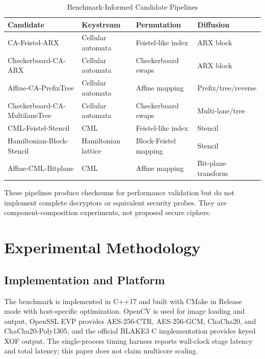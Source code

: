 \documentclass[twocolumn,runningheads]{svjour3}
\begin{document}
\begin{table}[t]
\caption{Benchmark-Informed Candidate Pipelines}
\label{tab:candidates}
\centering
\small
\setlength{\tabcolsep}{3pt}
\begin{tabular}{@{}p{}p{}p{}p{}@{}}
\toprule
\textbf{Candidate} & \textbf{Keystream} & \textbf{Permutation} & \textbf{Diffusion} \\
\midrule
CA-Feistel-ARX & Cellular automata & Feistel-like index & ARX block \\
Checkerboard-CA-ARX & Cellular automata & Checkerboard swaps & ARX block \\
Affine-CA-PrefixTree & Cellular automata & Affine mapping & Prefix/tree/reverse \\
Checkerboard-CA-MultilaneTree & Cellular automata & Checkerboard swaps & Multi-lane/tree \\
CML-Feistel-Stencil & CML & Feistel-like index & Stencil \\
Hamiltonian-Block-Stencil & Hamiltonian lattice & Block-Feistel mapping & Stencil \\
Affine-CML-Bitplane & CML & Affine mapping & Bit-plane transform \\
\bottomrule
\end{tabular}
\end{table}

These pipelines produce checksums for performance validation but do not
implement complete decryptors or equivalent security probes. They are
component-composition experiments, not proposed secure ciphers.

\section{Experimental Methodology}
\label{sec:methodology}

\subsection{Implementation and Platform}

The benchmark is implemented in C++17 and built with CMake in Release mode
with host-specific optimization. OpenCV is used for image loading and output,
OpenSSL EVP provides AES-256-CTR, AES-256-GCM, ChaCha20, and ChaCha20-Poly1305,
and the official BLAKE3 C implementation provides keyed XOF output. The
single-process timing harness reports wall-clock stage latency and total
latency; this paper does not claim multicore scaling.
\end{document}
